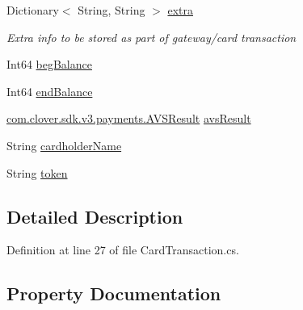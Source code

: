 \begin{DoxyCompactItemize}
\item 
Dictionary$<$ String, String $>$ \hyperlink{classcom_1_1clover_1_1sdk_1_1v3_1_1payments_1_1_card_transaction_a6303e2e34aa968eaed5a608fbc5cde24}{extra}
\begin{DoxyCompactList}\small\item\em Extra info to be stored as part of gateway/card transaction \end{DoxyCompactList}\item 
Int64 \hyperlink{classcom_1_1clover_1_1sdk_1_1v3_1_1payments_1_1_card_transaction_a6bd82b66a58cbddd8c7de8f3ccc0088e}{beg\+Balance}
\item 
Int64 \hyperlink{classcom_1_1clover_1_1sdk_1_1v3_1_1payments_1_1_card_transaction_a10611fe7fe1f7e993f772f20c567b944}{end\+Balance}
\item 
\hyperlink{namespacecom_1_1clover_1_1sdk_1_1v3_1_1payments_a81b51961db7fb2e8c34fefd28183a8a1}{com.\+clover.\+sdk.\+v3.\+payments.\+A\+V\+S\+Result} \hyperlink{classcom_1_1clover_1_1sdk_1_1v3_1_1payments_1_1_card_transaction_ae41fa01597fe6371d4af82646b3310ee}{avs\+Result}
\item 
String \hyperlink{classcom_1_1clover_1_1sdk_1_1v3_1_1payments_1_1_card_transaction_a9f3250f54863da2de849237e218a023f}{cardholder\+Name}
\item 
String \hyperlink{classcom_1_1clover_1_1sdk_1_1v3_1_1payments_1_1_card_transaction_a7dabfba833640e78d38a60dab107bf55}{token}
\end{DoxyCompactItemize}


\subsection{Detailed Description}


Definition at line 27 of file Card\+Transaction.\+cs.



\subsection{Property Documentation}
\mbox{\label{classcom_1_1clover_1_1sdk_1_1v3_1_1payments_1_1_card_transaction_a7f036a82b6ff6786391b5b36962454d3}} 
